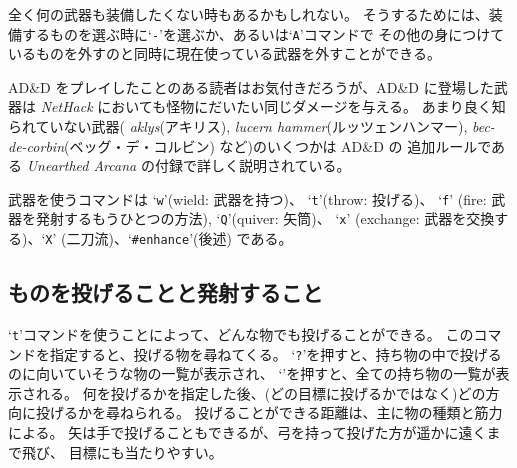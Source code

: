 全く何の武器も装備したくない時もあるかもしれない。
そうするためには、装備するものを選ぶ時に`{\tt -}'を選ぶか、あるいは`{\tt A}'コマンドで
その他の身につけているものを外すのと同時に現在使っている武器を外すことができる。

AD\&D をプレイしたことのある読者はお気付きだろうが、AD\&D に登場した武器は
{\it NetHack\/} においても怪物にだいたい同じダメージを与える。
あまり良く知られていない武器( %
{\it aklys}(アキリス), {\it lucern hammer}(ルッツェンハンマー),
{\it bec-de-corbin\/}(ベッグ・デ・コルビン) など)のいくつかは AD\&D の
追加ルールである {\it Unearthed Arcana} の付録で詳しく説明されている。

武器を使うコマンドは `{\tt w}'(wield: 武器を持つ)、 `{\tt t}'(throw: 投げる)、
`{\tt f}' (fire: 武器を発射するもうひとつの方法), `{\tt Q}'(quiver: 矢筒)、
`{\tt x}' (exchange: 武器を交換する)、`{\tt X}' (二刀流)、`{\tt \#enhance}'(後述) である。

\subsection*{ものを投げることと発射すること}

`{\tt t}'コマンドを使うことによって、どんな物でも投げることができる。
このコマンドを指定すると、投げる物を尋ねてくる。
`{\tt ?}'を押すと、持ち物の中で投げるのに向いていそうな物の一覧が表示され、
`{\tt *}'を押すと、全ての持ち物の一覧が表示される。
何を投げるかを指定した後、(どの目標に投げるかではなく)どの方向に投げるかを尋ねられる。
投げることができる距離は、主に物の種類と筋力による。
矢は手で投げることもできるが、弓を持って投げた方が遥かに遠くまで飛び、
目標にも当たりやすい。

